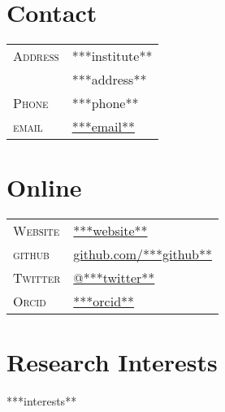 \documentclass[10pt]{article}
\begin{document}

\par{\bigskip\par}


\begin{multicols}{2}
\setlength{\parskip}{0pt}
%
\section{Contact}
\begin{tabularx}{\linewidth}{@{}l X@{}}
  \textsc{Address} & \small{***institute**} \\
                   & \small{***address**} \\
  \textsc{Phone}   & \small{***phone**}\\
  \textsc{email}   & \href{mailto:***email**}{***email**} \\
\end{tabularx}

\columnbreak

\section{Online}
\begin{tabularx}{\linewidth}{@{}l X@{}}
  \textsc{Website}  & \href{***websiteescaped**}{***website**} \\
  \textsc{github}   & \href{http://www.github.com/***github**}{github.com/***github**}\\
  \textsc{Twitter}  & \href{https://twitter.com/***twitter**}{@***twitter**} \\
  \textsc{Orcid}    & \href{http://orcid.org/***orcid**}{***orcid**} \\
\end{tabularx}

\end{multicols}

\vspace{-2em}
\section{Research Interests}

***interests**


\newcommand{\degree}[4]{\textsc{#1} & \textbf{#2} & \textsc{#3} & \textbf{#4}\\}
\end{document}
